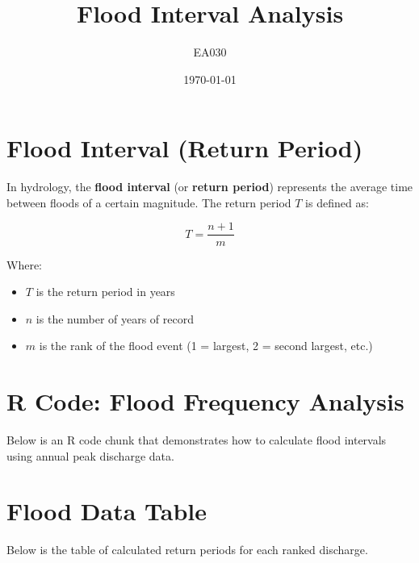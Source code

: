 \documentclass{article}
\title{Flood Interval Analysis}
\author{EA030}
\date{\today}
\begin{document}
\maketitle

\section*{Flood Interval (Return Period)}

In hydrology, the \textbf{flood interval} (or \textbf{return period}) represents the average time between floods of a certain magnitude. The return period \( T \) is defined as:

\[
T = \frac{n + 1}{m}
\]

Where:
\begin{itemize}
  \item \( T \) is the return period in years
  \item \( n \) is the number of years of record
  \item \( m \) is the rank of the flood event (1 = largest, 2 = second largest, etc.)
\end{itemize}

\section*{R Code: Flood Frequency Analysis}

Below is an R code chunk that demonstrates how to calculate flood intervals using annual peak discharge data.

\begin{knitrout}
\color{fgcolor}\begin{kframe}
\begin{alltt}
 \hlkwb{<-} \hlstd{(}\hlstd{,} \hlstd{,} \hlstd{,} \hlstd{,} \hlstd{,} \hlstd{,} \hlstd{,} \hlstd{,} \hlstd{,} \hlstd{)}

 \hlkwb{<-}   \hlstd{=} \hlstd{)}

 \hlkwb{<-} \hlopt{:}
 \hlkwb{<-} 
 \hlkwb{<-}  \hlopt{+} \hlstd{)} \hlopt{/} 

 \hlkwb{<-} \hlstd{(}
   
   
   
\hlstd{)}

\end{alltt}
\end{kframe}
\end{knitrout}



\section*{Flood Data Table}

Below is the table of calculated return periods for each ranked discharge.
\end{document}
